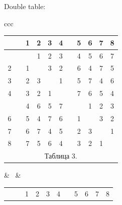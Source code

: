 Double table:





\begin{center}





\begin{tabular}{ccc}





\begin{tabular}{ccccccccccc}


\ & \vline & 1 & 2 & 3 & 4 & \vline & 5 & 6 & 7 & 8 \\


\hline


 1 & \vline & \ & 1 & 2 & 3 & \vline & 4 & 5 & 6 & 7 \\


2 & \vline & 1 & \ & 3 & 2 & \vline & 6 & 4 & 7 & 5 \\


3 & \vline & 2 & 3 & \ & 1 & \vline & 5 & 7 & 4 & 6 \\


4 & \vline & 3 & 2 & 1 & \ & \vline & 7 & 6 & 5 & 4 \\


\hline


 5 & \vline & 4 & 6 & 5 & 7 & \vline & \ & 1 & 2 & 3 \\


6 & \vline & 5 & 4 & 7 & 6 & \vline & 1 & \ & 3 & 2 \\


7 & \vline & 6 & 7 & 4 & 5 & \vline & 2 & 3 & \ & 1 \\


8 & \vline & 7 & 5 & 6 & 4 & \vline & 3 & 2 & 1 & \ \\


\multicolumn{11}{c}{ Таблица 3.}


\end{tabular}





& \ & 





\begin{tabular}{ccccccccccc}


\ & \vline & 1 & 2 & 3 & 4 & \vline & 5 & 6 & 7 & 8 \\



\end{tabular}
\end{tabular}
\end{center}
